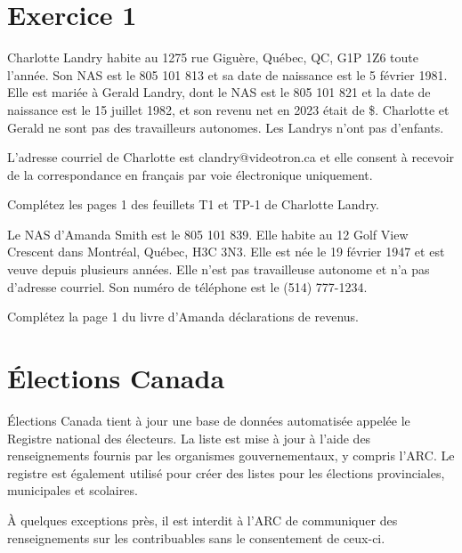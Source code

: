 \section{Exercice 1}
\setcounter{question}{0}
\begin{question}
	Charlotte Landry habite au 1275 rue Giguère, Québec, QC, G1P 1Z6 toute l’année. Son NAS est le 805 101 813 et sa date de naissance est le 5 février 1981. Elle est mariée à Gerald Landry, dont le NAS est le 805 101 821 et la date de naissance est le 15 juillet 1982, et son revenu net en 2023 était de  \$. Charlotte et Gerald ne sont pas des travailleurs autonomes. Les Landrys n’ont pas d’enfants.
	
	L’adresse courriel de Charlotte est clandry@videotron.ca et elle consent à recevoir de la correspondance en français par voie électronique uniquement.
	
	Complétez les pages 1 des feuillets T1 et TP-1 de Charlotte Landry.
\end{question}



\begin{question}
	Le NAS d’Amanda Smith est le 805 101 839. Elle habite au 12 Golf View Crescent dans Montréal, Québec, H3C 3N3. Elle est née le 19 février 1947 et est veuve depuis plusieurs années. Elle n’est pas travailleuse autonome et n’a pas d’adresse courriel. Son numéro de téléphone est le (514) 777-1234.
	
	Complétez la page 1 du livre d’Amanda déclarations de revenus.
\end{question}





\section{Élections Canada}
\begin{intro}
	Élections Canada tient à jour une base de données automatisée appelée le Registre national des électeurs. La liste est mise à jour à l'aide des renseignements fournis par les organismes gouvernementaux, y compris l'ARC. Le registre est également utilisé pour créer des listes pour les élections provinciales, municipales et scolaires.
\end{intro}
À quelques exceptions près, il est interdit à l'ARC de communiquer des renseignements sur les contribuables sans le consentement de ceux-ci.


